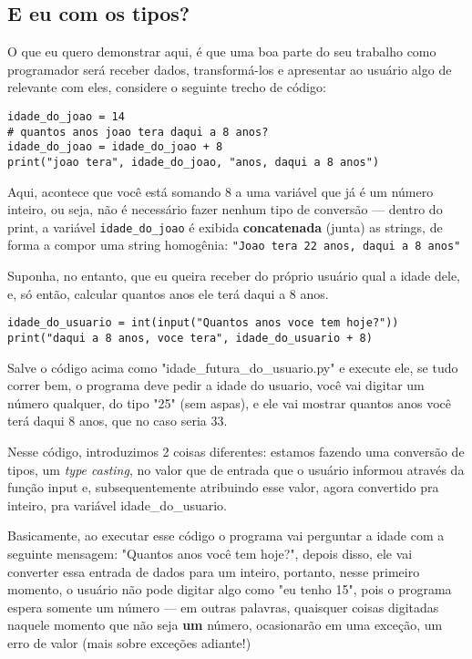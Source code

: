 \documentclass[12pt]{book}
\begin{document}
	\subsection{E eu com os tipos?}
	
	O que eu quero demonstrar aqui, é que uma boa parte do seu trabalho como programador será receber dados, transformá-los e apresentar ao usuário algo de relevante com eles, considere o seguinte trecho de código:
	
	\begin{lstlisting}[caption={uma conta simples}] 
idade_do_joao = 14
# quantos anos joao tera daqui a 8 anos?
idade_do_joao = idade_do_joao + 8
print("joao tera", idade_do_joao, "anos, daqui a 8 anos")\end{lstlisting}
	
	Aqui, acontece que você está somando 8 a uma variável que já é um número inteiro, ou seja, não é necessário fazer nenhum tipo de conversão --- dentro do print, a variável \texttt{idade\_do\_joao} é exibida \textbf{concatenada} (junta) as strings, de forma a compor uma string homogênia: \texttt{"Joao tera 22 anos, daqui a 8 anos"}
	
	Suponha, no entanto, que eu queira receber do próprio usuário qual a idade dele, e, só então, calcular quantos anos ele terá daqui a 8 anos.
	
	\begin{lstlisting}[caption={Calculando a idade futura do usuário}]
idade_do_usuario = int(input("Quantos anos voce tem hoje?"))
print("daqui a 8 anos, voce tera", idade_do_usuario + 8)\end{lstlisting}
	
	Salve o código acima como "idade\_futura\_do\_usuario.py" e execute ele, se tudo correr bem, o programa deve pedir a idade do usuario, você vai digitar um número qualquer, do tipo "25" (sem aspas), e ele vai mostrar quantos anos você terá daqui 8 anos, que no caso seria 33.
	
	Nesse código, introduzimos 2 coisas diferentes: estamos fazendo uma conversão de tipos, um \textit{type casting}, no valor que de entrada que o usuário informou através da função input e, subsequentemente atribuindo esse valor, agora convertido pra inteiro, pra variável idade\_do\_usuario.
	
	Basicamente, ao executar esse código o programa vai perguntar a idade com a seguinte mensagem: "Quantos anos você tem hoje?", depois disso, ele vai converter essa entrada de dados para um inteiro, portanto, nesse primeiro momento, o usuário não pode digitar algo como "eu tenho 15", pois o programa espera somente um número --- em outras palavras, quaisquer coisas digitadas naquele momento que não seja \textbf{um} número, ocasionarão em uma exceção, um erro de valor (mais sobre exceções adiante!)
	
\end{document}
